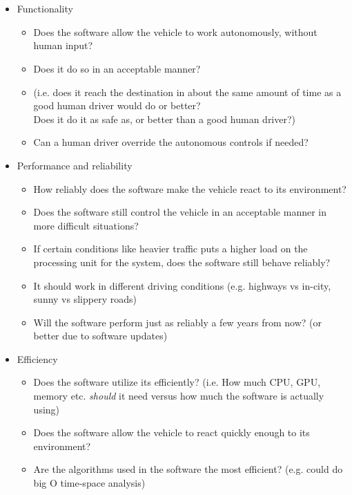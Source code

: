 \documentclass[letterpaper]{article}
\begin{document}
\section{}

\begin{itemize}
	\item Functionality
	      \begin{itemize}
		      \item Does the software allow the vehicle to work autonomously, without human input?
		      \item Does it do so in an acceptable manner?
		      \item (i.e. does it reach the destination in about the same amount of time as a good human driver would do or better?\\
		            Does it do it as safe as, or better than a good human driver?)
		      \item Can a human driver override the autonomous controls if needed?
	      \end{itemize}

	\item Performance and reliability
	      \begin{itemize}
		      \item How reliably does the software make the vehicle react to its environment?
		      \item Does the software still control the vehicle in an acceptable manner in more difficult situations?
		      \item If certain conditions like heavier traffic puts a higher load on the processing unit for the system, does the software still behave reliably?
		      \item It should work in different driving conditions (e.g. highways vs in-city, sunny vs slippery roads)
		      \item Will the software perform just as reliably a few years from now? (or better due to software updates)
	      \end{itemize}

	\item Efficiency
	      \begin{itemize}
		      \item Does the software utilize its efficiently?
		            (i.e. How much CPU, GPU, memory etc. \textit{should} it need versus how much the software is actually using)
		      \item Does the software allow the vehicle to react quickly enough to its environment?
		      \item Are the algorithms used in the software the most efficient? (e.g. could do big O time-space analysis)
	      \end{itemize}


\end{itemize}
\end{document}
